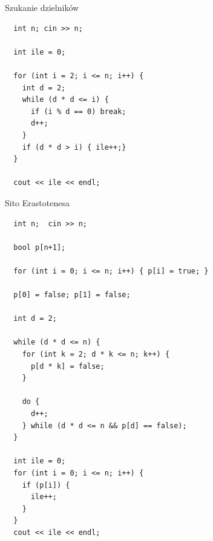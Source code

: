 \documentclass[a4paper,10pt]{scrartcl}
\begin{document}
\newpage
\begin{center}Szukanie dzielników\end{center}
\begin{lstlisting}
  int n; cin >> n;

  int ile = 0;

  for (int i = 2; i <= n; i++) {
    int d = 2;
    while (d * d <= i) {
      if (i % d == 0) break;
      d++;
    }
    if (d * d > i) { ile++;}
  }

  cout << ile << endl;
\end{lstlisting}

\vspace{5mm}
\begin{center}Sito Erastotenesa\end{center}
\begin{lstlisting}
  int n;  cin >> n;

  bool p[n+1];

  for (int i = 0; i <= n; i++) { p[i] = true; }

  p[0] = false; p[1] = false;

  int d = 2;

  while (d * d <= n) {
    for (int k = 2; d * k <= n; k++) {
      p[d * k] = false;
    }

    do {
      d++;
    } while (d * d <= n && p[d] == false);
  }

  int ile = 0;
  for (int i = 0; i <= n; i++) {
    if (p[i]) {
      ile++;
    }
  }
  cout << ile << endl;
\end{lstlisting}
\end{document}
